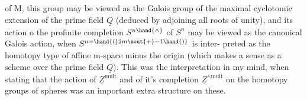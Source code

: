 of M,  this group may be viewed as the  Galois group of the maximal
cyclotomic extension of the prime field $\underline{Q}$  (deduced by adjoining\unsure{\hand{,}} all
roots of unity),  and its action o  the profinite completion $S^{n\hand{\wedge}}$ of $S^n$
may be viewed as the canonical Galois action,  when $S^{n=\hand{(}2m\xout{+}-1\hand{)}}$ is inter-%
preted as the homotopy type of affine  m-space minus the origin
(which makes a sense as a scheme over  the prime field $\underline{Q}$).  This was
the interpretation in my mind,  when stating that the action of $\underline{Z}^{\mathrm{mult}}$
and of it's completion $\underline{Z}^{\wedge\mathrm{mult}}$  on the homotopy groups of spheres was
an important extra structure on these.


